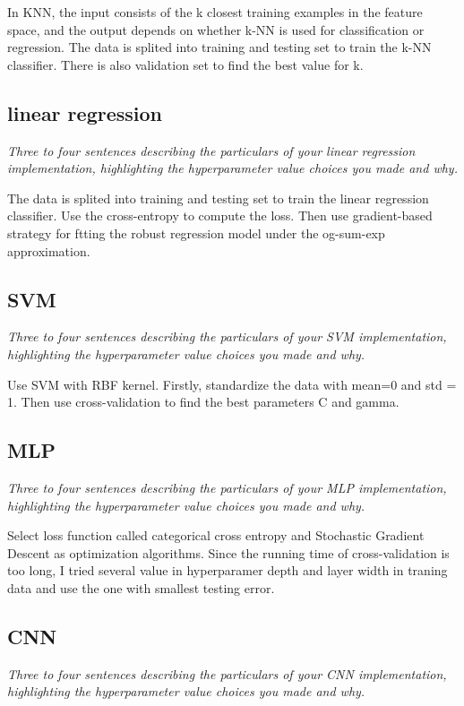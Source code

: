 \documentclass{article}
\def\gre#1{{\color{gre}#1}}
\begin{document}
\gre{In KNN, the input consists of the k closest training examples in the feature space, and the output depends on whether k-NN is used for classification or regression. The data is splited into training and testing set to train the k-NN classifier. There is also validation set to find the best value for k.}

\subsection{linear regression}
\emph{Three to four sentences describing the particulars of your linear regression implementation, highlighting the hyperparameter value choices you made and why.}

\gre{The data is splited into training and testing set to train the linear regression classifier. Use the cross-entropy to compute the loss. Then use gradient-based strategy for ftting the robust regression model under the og-sum-exp approximation.
}
\subsection{SVM}
\emph{Three to four sentences describing the particulars of your SVM implementation, highlighting the hyperparameter value choices you made and why.}

\gre{Use SVM with RBF kernel. Firstly, standardize the data with mean=0 and std = 1. Then use cross-validation to find the best parameters C and gamma.}

\subsection{MLP}
\emph{Three to four sentences describing the particulars of your MLP implementation, highlighting the hyperparameter value choices you made and why.}

\gre{Select loss function called categorical cross entropy and Stochastic Gradient Descent as optimization algorithms. Since the running time of cross-validation is too long, I tried several value in hyperparamer depth and layer width in traning data and use the one with smallest testing error.
}

\subsection{CNN}
\emph{Three to four sentences describing the particulars of your CNN implementation, highlighting the hyperparameter value choices you made and why.}
\end{document}
